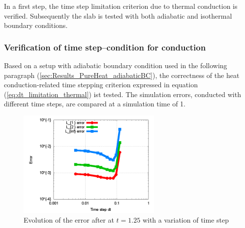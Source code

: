 \documentclass[11pt,a4paper,twoside]{report}
\begin{document}
In a first step, the time step limitation criterion due to thermal conduction is verified. Subsequently the slab is tested with both adiabatic and isothermal boundary conditions. 

\subsubsection{Verification of time step--condition for conduction}

Based on a setup with adiabatic boundary condition used in the following paragraph (\ref{sec:Results_PureHeat_adiabaticBC}), the correctness of the
heat conduction-related time stepping criterion expressed in equation (\ref{eq:dt_limitation_thermal}) ist tested. The simulation errors, conducted with different time steps, are compared at a simulation time of 1. 


\begin{figure}[h]  
  \label{fig:PureHeat_dtVerification}
  \centering
  \includegraphics[width=7cm]{Graphics/results/PureHeatConduction/ErrorTimestep}
  \caption{Evolution of the error after at $t=1.25$ with a variation of time step}
\end{figure}
\end{document}
